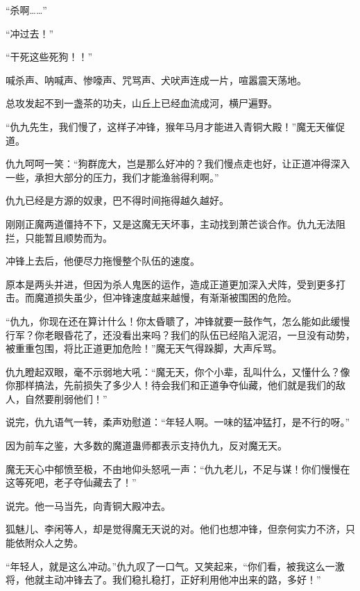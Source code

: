 
\begin{this_body}



“杀啊……”

“冲过去！”

“干死这些死狗！！”

喊杀声、呐喊声、惨嚎声、咒骂声、犬吠声连成一片，喧嚣震天荡地。

总攻发起不到一盏茶的功夫，山丘上已经血流成河，横尸遍野。

“仇九先生，我们慢了，这样子冲锋，猴年马月才能进入青铜大殿！”魔无天催促道。

仇九呵呵一笑：“狗群庞大，岂是那么好冲的？我们慢点走也好，让正道冲得深入一些，承担大部分的压力，我们才能渔翁得利啊。”

仇九已经是方源的奴隶，巴不得时间拖得越久越好。

刚刚正魔两道僵持不下，又是这魔无天坏事，主动找到萧芒谈合作。仇九无法阻拦，只能暂且顺势而为。

冲锋上去后，他便尽力拖慢整个队伍的速度。

原本是两头并进，但因为杀人鬼医的运作，造成正道更加深入犬阵，受到更多打击。而魔道损失虽少，但冲锋速度越来越慢，有渐渐被围困的危险。

“仇九，你现在还在算计什么！你太昏聩了，冲锋就要一鼓作气，怎么能如此缓慢行军？你老眼昏花了，还没看出来吗？我们的队伍已经陷入泥沼，一旦没有动势，被重重包围，将比正道更加危险！”魔无天气得跺脚，大声斥骂。

仇九瞪起双眼，毫不示弱地大吼：“魔无天，你个小辈，乱叫什么，又懂什么？像你那样搞法，先前损失了多少人！待会我们和正道争夺仙藏，他们就是我们的敌人，自然要削弱他们！”

说完，仇九语气一转，柔声劝慰道：“年轻人啊。一味的猛冲猛打，是不行的呀。”

因为前车之鉴，大多数的魔道蛊师都表示支持仇九，反对魔无天。

魔无天心中郁愤至极，不由地仰头怒吼一声：“仇九老儿，不足与谋！你们慢慢在这等死吧，老子夺仙藏去了！”

说完。他一马当先，向青铜大殿冲去。

狐魅儿、李闲等人，却是觉得魔无天说的对。他们也想冲锋，但奈何实力不济，只能依附众人之势。

“年轻人，就是这么冲动。”仇九叹了一口气。又笑起来，“你们看，被我这么一激将，他就主动冲锋去了。我们稳扎稳打，正好利用他冲出来的路，多好！”


\end{this_body}
